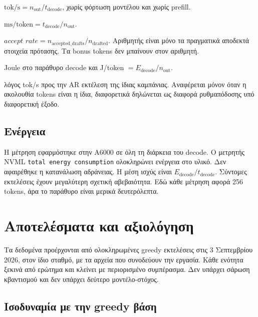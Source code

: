 \documentclass[a4paper,12pt]{report}
\theoremstyle{plain}
\theoremstyle{definition}
\theoremstyle{remark}
\begin{document}
\begin{description}[style=nextline,leftmargin=1.6em]
  \item[Ρυθμαπόδοση decode.]
    \(\mathrm{tok/s}=n_{\mathrm{out}}/t_{\mathrm{decode}}\), χωρίς φόρτωση
    μοντέλου και χωρίς prefill.
  \item[Καθυστέρηση.]
    \(\mathrm{ms/token}=t_{\mathrm{decode}}/n_{\mathrm{out}}\).
  \item[Αποδοχή.]
    \(\textit{accept rate}=n_{\mathrm{accepted\_drafts}}/n_{\mathrm{drafted}}\).
    Αριθμητής είναι μόνο τα πραγματικά αποδεκτά στοιχεία πρότασης. Τα bonus
    tokens δεν μπαίνουν στον αριθμητή.
  \item[Ενέργεια.]
    Joule στο παράθυρο decode και J/token
    \(=E_{\mathrm{decode}}/n_{\mathrm{out}}\).
  \item[Speedup.]
    λόγος tok/s προς την AR εκτέλεση της ίδιας καμπάνιας. Αναφέρεται μόνον όταν
    η ακολουθία tokens είναι η ίδια, διαφορετικά δηλώνεται ως διαφορά
    ρυθμαπόδοσης υπό διαφορετική έξοδο.
\end{description}

\section{Ενέργεια}
\label{sec:energy}

Η μέτρηση εφαρμόστηκε στην A6000 σε όλη τη διάρκεια του decode. Ο μετρητής
NVML \texttt{total energy consumption} ολοκληρώνει ενέργεια στο υλικό. Δεν
αφαιρέθηκε η κατανάλωση αδράνειας. Η μέση ισχύς είναι
\(E_{\mathrm{decode}}/t_{\mathrm{decode}}\).
Σύντομες εκτελέσεις έχουν μεγαλύτερη σχετική αβεβαιότητα. Εδώ κάθε μέτρηση
αφορά 256 tokens, άρα το παράθυρο είναι μερικά δευτερόλεπτα.

\chapter{Αποτελέσματα και αξιολόγηση}
\label{ch:results}

Τα δεδομένα προέρχονται από ολοκληρωμένες greedy εκτελέσεις στις 3
Σεπτεμβρίου 2026, στον ίδιο σταθμό, με τα αρχεία που συνοδεύουν την εργασία.
Κάθε ενότητα ξεκινά από ερώτημα και κλείνει με περιορισμένο συμπέρασμα. Δεν
υπάρχει σάρωση κβαντισμού και δεν υπάρχει δεύτερο μοντέλο-στόχος.

\section{Ισοδυναμία με την greedy βάση}
\label{sec:parity}
\end{document}
